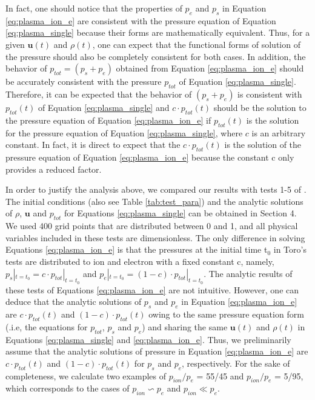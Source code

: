 \documentclass[journal, onecolumn]{aastex631}
\begin{document}
\begin{CJK*}{UTF8}{gbsn}
\begin{appendix}
In fact, one should notice that the properties of $p_e$ and $p_s$ in Equation \ref{eq:plasma_ion_e} are consistent with the pressure equation of Equation \ref{eq:plasma_single} because their forms are mathematically equivalent. Thus, for a given $\textbf{u}(t)$ and $\rho(t)$, one can expect that the functional forms of solution of the pressure should also be completely consistent for both cases. In addition, the behavior of $p_{tot} = (p_s+p_e)$ obtained from Equation \ref{eq:plasma_ion_e} should be accurately consistent with the pressure $p_{tot}$ of Equation \ref{eq:plasma_single}. Therefore, it can be expected that the behavior of $(p_s+p_e)$ is consistent with $p_{tot}(t)$ of Equation \ref{eq:plasma_single} and $c\cdot p_{tot}(t)$ should be the solution to the pressure equation of Equation \ref{eq:plasma_ion_e} if $p_{tot}(t)$ is the solution for the pressure equation of Equation \ref{eq:plasma_single}, where $c$ is an arbitrary constant. In fact, it is direct to expect that the $c\cdot p_{tot}(t)$ is the solution of the pressure equation of Equation \ref{eq:plasma_ion_e} because the constant c only provides a reduced factor.

In order to justify the analysis above, we compared our results with tests 1-5 of \cite{Toro2009}. The initial conditions (also see Table \ref{tab:test_para}) and the analytic solutions of $\rho$, $\textbf{u}$ and $p_{tot}$ for Equations \ref{eq:plasma_single} can be obtained in Section 4. We used 400 grid points that are distributed between 0 and 1, and all physical variables included in these tests are dimensionless. The only difference in solving Equations \ref{eq:plasma_ion_e} is that the pressures at the initial time t$_0$ in Toro's tests are distributed to ion and electron with a fixed constant c, namely, $p_s|_{t=t_0}=c\cdot p_{tot}|_{t=t_0}$ and $p_e|_{t=t_0}=(1-c)\cdot p_{tot}|_{t=t_0}$. The analytic results of these tests of Equations \ref{eq:plasma_ion_e} are not intuitive. However, one can deduce that the analytic solutions of $p_s$ and  $p_e$ in Equation \ref{eq:plasma_ion_e} are $c\cdot p_{tot}(t)$ and $(1-c)\cdot p_{tot}(t)$ owing to the same pressure equation form (.i.e, the equations for $p_{tot}$, $p_{s}$ and $p_{e}$) and sharing the same $\textbf{u}(t)$ and $\rho(t)$ in Equations \ref{eq:plasma_single} and \ref{eq:plasma_ion_e}. Thus, we preliminarily assume that the analytic solutions of pressure in Equation \ref{eq:plasma_ion_e} are $c\cdot p_{tot}(t)$ and $(1-c)\cdot p_{tot}(t)$ for $p_{s}$ and $p_{e}$, respectively. For the sake of completeness, we calculate two examples of $p_{ion}/p_e$ = 55/45 and $p_{ion}/p_e$ = 5/95, which corresponds to the cases of $p_{ion}\backsim p_e$ and $p_{ion} \ll p_e$.


\end{appendix}
\end{CJK*}
\end{document}
